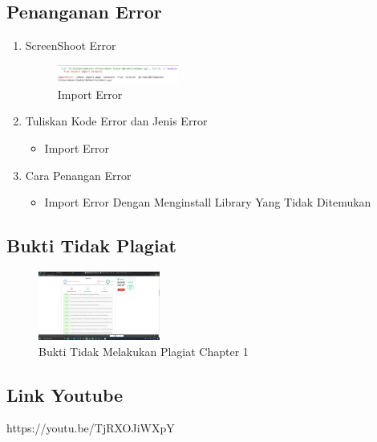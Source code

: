 \subsection{Penanganan Error}
\begin{enumerate}
	\item ScreenShoot Error
	\begin{figure}[H]
		\includegraphics[width=4cm]{figures/1174073/1/error/1.png}
		\centering
		\caption{Import Error}
	\end{figure}

	\item Tuliskan Kode Error dan Jenis Error
	\begin{itemize}
		\item Import Error
	\end{itemize}
	\item Cara Penangan Error
	\begin{itemize}
		\item Import Error
		\hfill\break
		Dengan Menginstall Library Yang Tidak Ditemukan
	\end{itemize}
\end{enumerate}

\subsection{Bukti Tidak Plagiat}
\begin{figure}[H]
	\includegraphics[width=4cm]{figures/1174073/1/plagiat/plagiat.png}
	\centering
	\caption{Bukti Tidak Melakukan Plagiat Chapter 1}
\end{figure}

\subsection{Link Youtube}
https://youtu.be/TjRXOJiWXpY


